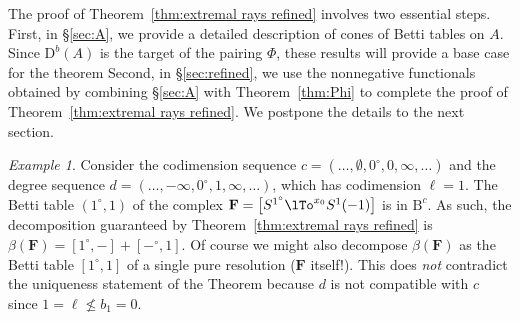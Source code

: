 \documentclass[12pt]{amsart}
\theoremstyle{definition}
\theoremstyle{remark}
\newtheorem{example}[lemma]{Example}
\newcommand{\cc}{c}
\newcommand{\dd}{d}
\newcommand{\FF}{\mathbf{F}}
\newcommand{\nothing}{\emptyset}
\newcommand{\DD}{\mathrm{D}}
\newcommand{\BBQ}{\mathrm{B}}
\begin{document}
The proof of Theorem~\ref{thm:extremal rays refined} involves two essential steps.  First, in \S\ref{sec:A}, we provide a detailed description of cones of Betti tables on $A$.  Since $\DD^b(A)$ is the target of the pairing $\Phi$, these results will provide a base case for the theorem  Second, in \S\ref{sec:refined}, 
we use the nonnegative functionals obtained by combining  \S\ref{sec:A} with Theorem~\ref{thm:Phi} to complete the proof of Theorem~\ref{thm:extremal rays refined}. 
We postpone the details to the next section.
%
%

\begin{example}  

 Consider the codimension sequence $\cc=(\dots, \nothing,0^\circ,0,\infty,\dots)$ and the degree sequence $\dd=(\dots, -\infty,0^\circ ,1,\infty,\dots)$, which has codimension $\ell = 1$.  The Betti table 
 $(1^\circ, 1)$ of the complex $\FF=\left[ S^{1^\circ}\lTo^{x_{0}} S^1(-1)\right]$ is in $\BBQ^{\cc}$.
 As such, the decomposition guaranteed by Theorem~\ref{thm:extremal rays refined} is
 $\beta(\FF) = [1^{\circ}, -] + [-^{\circ}, 1]$. Of course we might also decompose $\beta(\FF)$
 as the Betti table $[1^{\circ}, 1]$ of a single pure resolution ($\FF$ itself!). This does \emph{not} contradict the uniqueness statement of the Theorem because $\dd$ is not compatible with $\cc$
 since $1= \ell \not\leq b_{1}= 0$.
\end{example}

% 
% 
%
%
\end{document}
